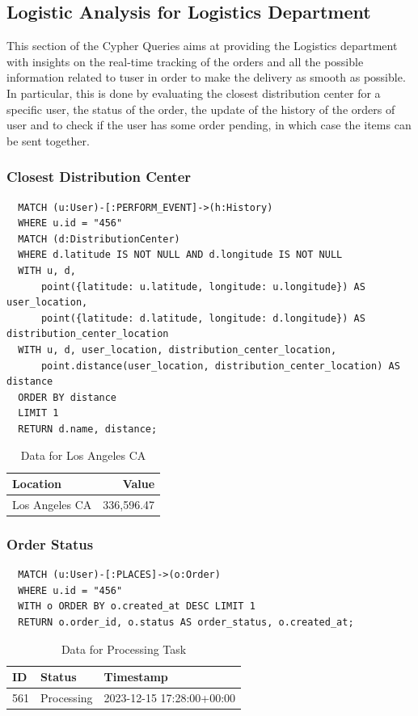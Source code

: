 \documentclass[a4paper,12pt]{article}
\begin{document}
\subsection{Logistic Analysis for Logistics Department}
This section of the Cypher Queries aims at providing the Logistics department with insights on the real-time tracking of the orders and all the possible information related to tuser in order to make the delivery as smooth as possible.
In particular, this is done by evaluating the closest distribution center for a specific user, the status of the order, the update of the history of the orders of user and to check if the user has some order pending, in which case the items can be sent together. 

\subsubsection{Closest Distribution Center}
\begin{verbatim}
  MATCH (u:User)-[:PERFORM_EVENT]->(h:History)
  WHERE u.id = "456"
  MATCH (d:DistributionCenter)
  WHERE d.latitude IS NOT NULL AND d.longitude IS NOT NULL
  WITH u, d, 
      point({latitude: u.latitude, longitude: u.longitude}) AS user_location, 
      point({latitude: d.latitude, longitude: d.longitude}) AS distribution_center_location
  WITH u, d, user_location, distribution_center_location, 
      point.distance(user_location, distribution_center_location) AS distance
  ORDER BY distance
  LIMIT 1
  RETURN d.name, distance;
\end{verbatim}

\begin{table}[h!]
  \centering
  \caption{Data for Los Angeles CA}
  \label{tab:los_angeles_data}
  \begin{tabular}{l r}
      \toprule
      \textbf{Location} & \textbf{Value} \\
      \midrule
      Los Angeles CA & 336,596.47 \\
      \bottomrule
  \end{tabular}
\end{table}

\subsubsection{Order Status}
\begin{verbatim}
  MATCH (u:User)-[:PLACES]->(o:Order)
  WHERE u.id = "456"
  WITH o ORDER BY o.created_at DESC LIMIT 1
  RETURN o.order_id, o.status AS order_status, o.created_at;
\end{verbatim}
\begin{table}[h!]
  \centering
  \caption{Data for Processing Task}
  \label{tab:processing_data}
  \begin{tabular}{l l l}
      \toprule
      \textbf{ID} & \textbf{Status} & \textbf{Timestamp} \\
      \midrule
      561 & Processing & 2023-12-15 17:28:00+00:00 \\
      \bottomrule
  \end{tabular}
\end{table}
\end{document}
